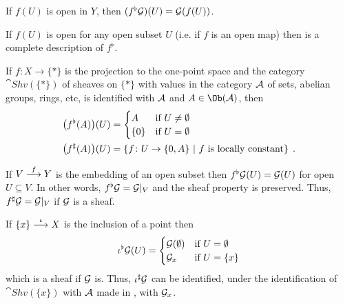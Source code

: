 \documentclass[a4paper,parskip=half,numbers=enddot, DIV=12]{scrreprt}
\begin{document}
    \begin{example}
        \begin{alphanumerate}
          \item 
            If $f(U)$ is open in $Y$, then $(f^\flat\mathcal{G})(U) = \mathcal{G}(f(U))$.
          \item 
            If $f(U)$ is open for any open subset $U$ (i.e. if $f$ is an open map) then  is a complete description of $f^\flat$.
          \item 
            If $f\colon X\to \{*\}$ is the projection to the one-point space and the category $\cat{Shv}(\{*\})$ of sheaves on $\{*\}$ with values in the category $\mathcal{A}$ of sets, abelian groups, rings, etc, is identified with $\mathcal{A}$ and $A\in\Ob(\Aa)$, then 
            \begin{align*}
                \big(f^\flat(A)\big)(U) &= \begin{cases} A &\text{if }U\neq\emptyset\\ \{0\} &\text{if } U= \emptyset \end{cases}\\
                \big(f^\sharp(A)\big)(U) &= \left\{f\colon U \to \{0,A\}\ \middle|\  f \text{ is locally constant}\right\}\;.
            \end{align*}
          \item 
            If $V\morphism[f] Y$ is the embedding of an open subset then $f^\flat \mathcal{G}(U) = \mathcal{G}(U)$ for open $U\subseteq V$. In other words, $f^\flat \mathcal{G} = \mathcal{G}|_V$ and the sheaf property is preserved. Thus, $f^\sharp \mathcal{G} = \mathcal{G}|_V$ if $\mathcal{G}$ is a sheaf.
          \item 
            If $\{x\} \morphism[\iota] X$ is the inclusion of a point then 
            \begin{align*}
                \iota^\flat\mathcal{G}(U) = \begin{cases} \mathcal{G}(\emptyset) & \text{if }U = \emptyset \\ \mathcal{G}_x&\text{if }U = \{x\}\end{cases}
            \end{align*}
            which is a sheaf if $\mathcal{G}$ is. Thus, $\iota^\sharp\mathcal{G}$ can be identified, under the identification of $\cat{Shv}(\{x\})$ with $\mathcal{A}$ made in , with $\mathcal{G}_x$.
        \end{alphanumerate}
    \end{example}
\end{document}
